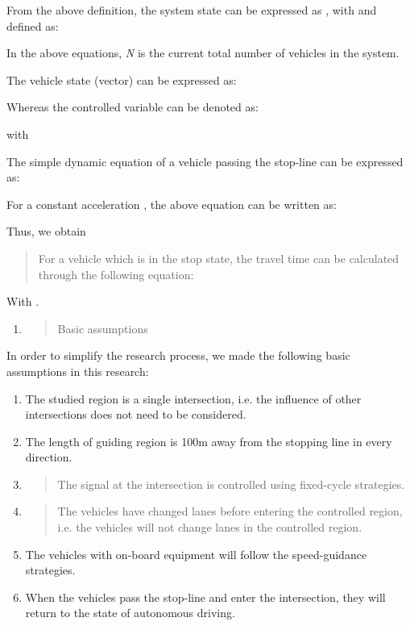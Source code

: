 From the above definition, the system state can be expressed as , with
and defined as:

In the above equations, \emph{N} is the current total number of vehicles
in the system.

The vehicle state (vector) can be expressed as:

Whereas the controlled variable can be denoted as:

with

The simple dynamic equation of a vehicle passing the stop-line can be
expressed as:

For a constant acceleration , the above equation can be written as:

Thus, we obtain

\begin{quote}
For a vehicle which is in the stop state, the travel time can be
calculated through the following equation:
\end{quote}

With .

\begin{enumerate}
\def\labelenumi{\arabic{enumi})}
\item
  \begin{quote}
  Basic assumptions
  \end{quote}
\end{enumerate}

In order to simplify the research process, we made the following basic
assumptions in this research:

\begin{enumerate}
\def\labelenumi{\alph{enumi})}
\item
  The studied region is a single intersection, i.e. the influence of
  other intersections does not need to be considered.
\item
  The length of guiding region is 100m away from the stopping line in
  every direction.
\item
  \begin{quote}
  The signal at the intersection is controlled using fixed-cycle
  strategies.
  \end{quote}
\item
  \begin{quote}
  The vehicles have changed lanes before entering the controlled region,
  i.e. the vehicles will not change lanes in the controlled region.
  \end{quote}
\item
  The vehicles with on-board equipment will follow the speed-guidance
  strategies.
\item
  When the vehicles pass the stop-line and enter the intersection, they
  will return to the state of autonomous driving.
\end{enumerate}

